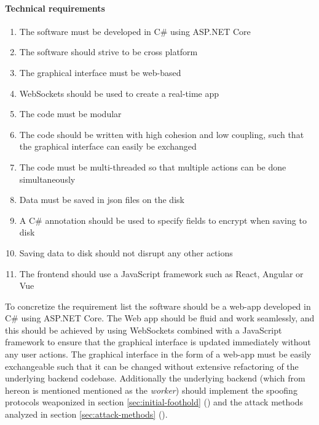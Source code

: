 \documentclass{article}
\begin{document}
\paragraph{Technical requirements}
\begin{enumerate}
    \item The software must be developed in C\# using ASP.NET Core
    \item The software should strive to be cross platform
    \item The graphical interface must be web-based
    \item WebSockets should be used to create a real-time app
    \item The code must be modular
    \item The code should be written with high cohesion and low coupling, such that the graphical interface can easily be exchanged
    \item The code must be multi-threaded so that multiple actions can be done simultaneously
    \item Data must be saved in \gls{json} files on the disk
    \item A C\# annotation should be used to specify fields to encrypt when saving to disk
    \item Saving data to disk should not disrupt any other actions
    \item The frontend should use a JavaScript framework such as React, Angular or Vue
\end{enumerate}

To concretize the requirement list the software should be a web-app developed in C\# using ASP.NET Core. The Web app should be fluid and work seamlessly, and this should be achieved by using WebSockets combined with a JavaScript framework to ensure that the graphical interface is updated immediately without any user actions. The graphical interface in the form of a web-app must be easily exchangeable such that it can be changed without extensive refactoring of the underlying backend codebase. Additionally the underlying backend (which from hereon is mentioned mentioned as the \emph{worker}) should implement the spoofing protocols weaponized in section \ref{sec:initial-foothold} () and the attack methods analyzed in section \ref{sec:attack-methods} ().
\end{document}
